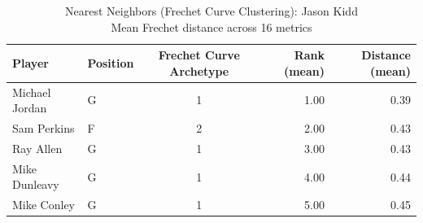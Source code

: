 \begin{table}[t]
\caption*{
{\fontsize{20}{25} Nearest Neighbors (Frechet Curve Clustering): Jason Kidd\fontsize{12}{15}\selectfont } \\ 
{\fontsize{14}{17}\selectfont  Mean Frechet distance across 16 metrics\fontsize{12}{15}\selectfont }
} 
\fontsize{12.0pt}{14.0pt}\selectfont
\begin{tabular*}{\linewidth}{@{\extracolsep{\fill}}llcrr}
\toprule
Player & Position & Frechet Curve Archetype & Rank (mean) & Distance (mean) \\ 
\midrule\addlinespace[2.5pt]
Michael Jordan & G & 1 & 1.00 & 0.39 \\ 
Sam Perkins & F & 2 & 2.00 & 0.43 \\ 
Ray Allen & G & 1 & 3.00 & 0.43 \\ 
Mike Dunleavy & G & 1 & 4.00 & 0.44 \\ 
Mike Conley & G & 1 & 5.00 & 0.45 \\ 
\bottomrule
\end{tabular*}
\end{table}

